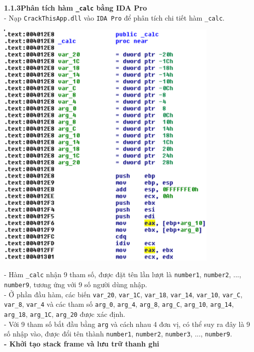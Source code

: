 \noindent\textbf{1.1.3\quad Phân tích hàm \texttt{\_calc} bằng IDA Pro}\\
- Nạp \texttt{CrackThisApp.dll} vào \texttt{IDA Pro} để phân tích chi tiết hàm \texttt{\_calc}.
\begin{center}
	\includegraphics[width=0.8\textwidth]{img/file-1/image5.png}
\end{center}
- Hàm \texttt{\_calc} nhận 9 tham số, được đặt tên lần lượt là \texttt{number1}, \texttt{number2}, ..., \texttt{number9}, tương ứng với 9 số người dùng nhập. \\
- Ở phần đầu hàm, các biến \texttt{var\_20}, \texttt{var\_1C}, \texttt{var\_18}, \texttt{var\_14}, \texttt{var\_10}, \texttt{var\_C}, \texttt{var\_8}, \texttt{var\_4} và các tham số \texttt{arg\_0}, \texttt{arg\_4}, \texttt{arg\_8}, \texttt{arg\_C}, \texttt{arg\_10}, \texttt{arg\_14}, \texttt{arg\_18}, \texttt{arg\_1C}, \texttt{arg\_20} được xác định. \\
- Với 9 tham số bắt đầu bằng \texttt{arg} và cách nhau 4 đơn vị, có thể suy ra đây là 9 số nhập vào, được đổi tên thành \texttt{number1}, \texttt{number2}, \texttt{number3}, ..., \texttt{number9}.\\
\textbf{- Khởi tạo stack frame và lưu trữ thanh ghi}

